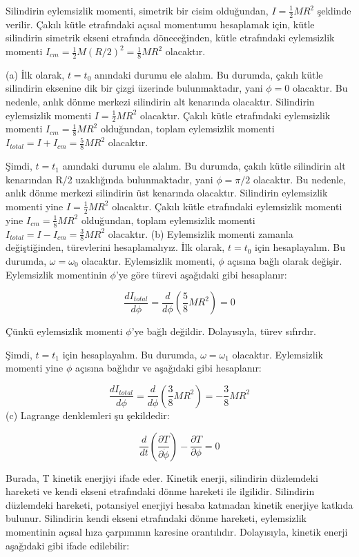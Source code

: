 \documentclass[12pt]{article}
\begin{document}
Silindirin eylemsizlik momenti, simetrik bir cisim olduğundan, $I = \frac{1}{2}MR^2$ şeklinde verilir. Çakılı kütle etrafındaki açısal momentumu hesaplamak için, kütle silindirin simetrik ekseni etrafında döneceğinden, kütle etrafındaki eylemsizlik momenti $I_{cm} = \frac{1}{2}M(R/2)^2 = \frac{1}{8}MR^2$ olacaktır.

(a) İlk olarak, $t=t_0$ anındaki durumu ele alalım. Bu durumda, çakılı kütle silindirin eksenine dik bir çizgi üzerinde bulunmaktadır, yani $\phi=0$ olacaktır. Bu nedenle, anlık dönme merkezi silindirin alt kenarında olacaktır. Silindirin eylemsizlik momenti $I = \frac{1}{2}MR^2$ olacaktır. Çakılı kütle etrafındaki eylemsizlik momenti $I_{cm} = \frac{1}{8}MR^2$ olduğundan, toplam eylemsizlik momenti $I_{total} = I + I_{cm} = \frac{5}{8}MR^2$ olacaktır.

Şimdi, $t=t_1$ anındaki durumu ele alalım. Bu durumda, çakılı kütle silindirin alt kenarından R/2 uzaklığında bulunmaktadır, yani $\phi=\pi/2$ olacaktır. Bu nedenle, anlık dönme merkezi silindirin üst kenarında olacaktır. Silindirin eylemsizlik momenti yine $I = \frac{1}{2}MR^2$ olacaktır. Çakılı kütle etrafındaki eylemsizlik momenti yine $I_{cm} = \frac{1}{8}MR^2$ olduğundan, toplam eylemsizlik momenti $I_{total} = I - I_{cm} = \frac{3}{8}MR^2$ olacaktır.
\newpage
(b) Eylemsizlik momenti zamanla değiştiğinden, türevlerini hesaplamalıyız. İlk olarak, $t=t_0$ için hesaplayalım. Bu durumda, $\omega = \omega_0$ olacaktır. Eylemsizlik momenti, $\phi$ açısına bağlı olarak değişir. Eylemsizlik momentinin $\phi$'ye göre türevi aşağıdaki gibi hesaplanır:

$$\frac{dI_{total}}{d\phi} = \frac{d}{d\phi} \left( \frac{5}{8}MR^2 \right) = 0$$

Çünkü eylemsizlik momenti $\phi$'ye bağlı değildir. Dolayısıyla, türev sıfırdır.

Şimdi, $t=t_1$ için hesaplayalım. Bu durumda, $\omega = \omega_1$ olacaktır. Eylemsizlik momenti yine $\phi$ açısına bağlıdır ve aşağıdaki gibi hesaplanır:

$$\frac{dI_{total}}{d\phi} = \frac{d}{d\phi} \left( \frac{3}{8}MR^2 \right) = -\frac{3}{8}MR^2 $$
\newpage
(c) Lagrange denklemleri şu şekildedir:

$$\frac{d}{dt} \left( \frac{\partial T}{\partial \dot{\phi}} \right) - \frac{\partial T}{\partial \phi} = 0 $$

Burada, T kinetik enerjiyi ifade eder. Kinetik enerji, silindirin düzlemdeki hareketi ve kendi ekseni etrafındaki dönme hareketi ile ilgilidir. Silindirin düzlemdeki hareketi, potansiyel enerjiyi hesaba katmadan kinetik enerjiye katkıda bulunur. Silindirin kendi ekseni etrafındaki dönme hareketi, eylemsizlik momentinin açısal hıza çarpımının karesine orantılıdır. Dolayısıyla, kinetik enerji aşağıdaki gibi ifade edilebilir:
\end{document}
